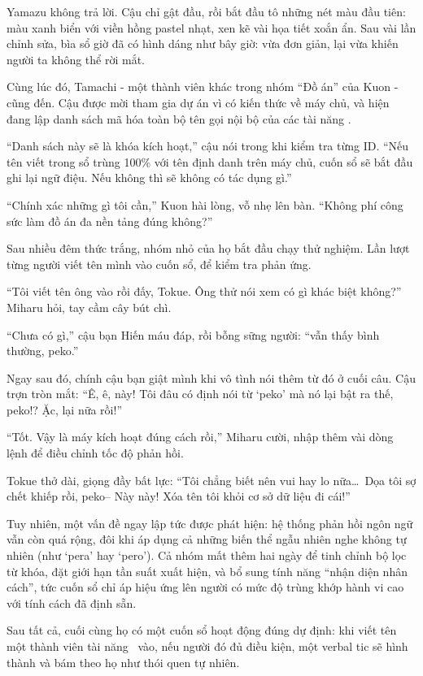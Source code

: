 \documentclass[../main.tex]{subfiles}
\begin{document}
Yamazu không trả lời. Cậu chỉ gật đầu, rồi bắt đầu tô những nét màu đầu tiên: màu xanh biển với viền hồng pastel nhạt, xen kẽ vài họa tiết xoắn ẩn. Sau vài lần chỉnh sửa, bìa sổ giờ đã có hình dáng như bây giờ: vừa đơn giản, lại vừa khiến người ta không thể rời mắt.

Cùng lúc đó, Tamachi - một thành viên khác trong nhóm ``Đồ án'' của Kuon - cũng đến. Cậu được mời tham gia dự án vì có kiến thức về máy chủ, và hiện đang lập danh sách mã hóa toàn bộ tên gọi nội bộ của các tài năng \hll.

``Danh sách này sẽ là khóa kích hoạt,'' cậu nói trong khi kiểm tra từng ID. ``Nếu tên viết trong sổ trùng 100\% với tên định danh trên máy chủ, cuốn sổ sẽ bắt đầu ghi lại ngữ điệu. Nếu không thì sẽ không có tác dụng gì.''

``Chính xác những gì tôi cần,'' Kuon hài lòng, vỗ nhẹ lên bàn. ``Không phí công sức làm đồ án đa nền tảng đúng không?''

Sau nhiều đêm thức trắng, nhóm nhỏ của họ bắt đầu chạy thử nghiệm. Lần lượt từng người viết tên mình vào cuốn sổ, để kiểm tra phản ứng.

``Tôi viết tên ông vào rồi đấy, Tokue. Ông thử nói xem có gì khác biệt không?'' Miharu hỏi, tay cầm cây bút chì.

``Chưa có gì,'' cậu bạn Hiến máu đáp, rồi bỗng sững người: ``vẫn thấy bình thường, peko.''

Ngay sau đó, chính cậu bạn giật mình khi vô tình nói thêm từ đó ở cuối câu. Cậu trợn tròn mắt: ``Ê, ê, này! Tôi đâu có định nói từ `peko' mà nó lại bật ra thế, peko!? Ặc, lại nữa rồi!''

``Tốt. Vậy là máy kích hoạt đúng cách rồi,'' Miharu cười, nhập thêm vài dòng lệnh để điều chỉnh tốc độ phản hồi.

Tokue thở dài, giọng đầy bất lực: ``Tôi chẳng biết nên vui hay lo nữa\dots\ Dọa tôi sợ chết khiếp rồi, peko-- Này này! Xóa tên tôi khỏi cơ sở dữ liệu đi cái!''

Tuy nhiên, một vấn đề ngay lập tức được phát hiện: hệ thống phản hồi ngôn ngữ vẫn còn quá rộng, đôi khi áp dụng cả những biến thể ngẫu nhiên nghe không tự nhiên (như `pera' hay `pero'). Cả nhóm mất thêm hai ngày để tinh chỉnh bộ lọc từ khóa, đặt giới hạn tần suất xuất hiện, và bổ sung tính năng ``nhận diện nhân cách'', tức cuốn sổ chỉ áp hiệu ứng lên người có mức độ trùng khớp hành vi cao với tính cách đã định sẵn.

Sau tất cả, cuối cùng họ có một cuốn sổ hoạt động đúng dự định: khi viết tên một thành viên tài năng \hll\ vào, nếu người đó đủ điều kiện, một verbal tic sẽ hình thành và bám theo họ như thói quen tự nhiên.
\end{document}
